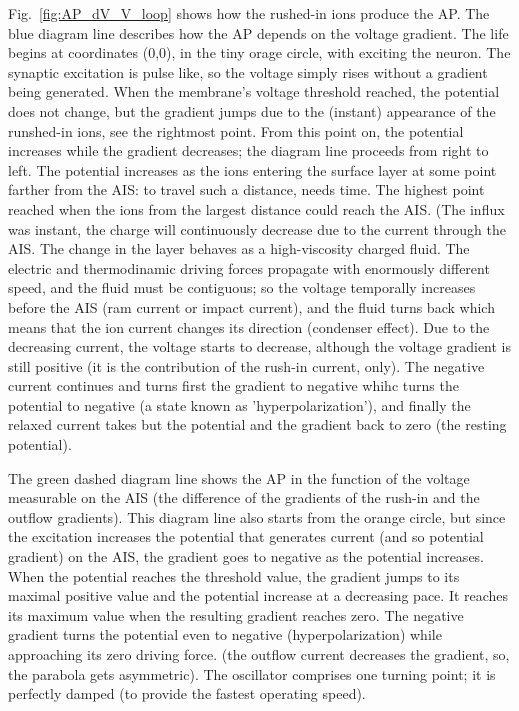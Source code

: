 Fig.~\ref{fig:AP_dV_V_loop} shows how the rushed-in ions produce the 
\gls{AP}. The blue diagram line describes how the AP depends on the voltage gradient.
The life begins at coordinates (0,0), in the tiny orage circle, with
exciting the neuron. 
The synaptic excitation is pulse like, so the
voltage simply rises without a gradient being generated.
When the membrane's voltage threshold reached, the potential does not change,
but the gradient jumps due to the (instant) appearance of the runshed-in ions,
see the rightmost point. 
From this point on, the potential increases while the gradient decreases;
the diagram line proceeds from right to left.
The potential increases as the ions entering the surface layer at some
point farther from the \gls{AIS}: to travel such a distance, needs time.
The highest point reached when the ions from the largest distance could
reach the AIS. (The influx was instant, the charge will continuously decrease
due to the current through the AIS.
The change in the layer behaves as a high-viscosity charged fluid.
The electric and thermodinamic driving forces propagate with enormously
different speed, and the fluid must be contiguous; so the voltage temporally increases before the AIS
(ram current or impact current), and the fluid turns back which means that the ion current changes its direction (condenser effect).
Due to the decreasing current, the voltage starts to decrease, although 
the voltage gradient is still positive (it is the contribution of the
rush-in current, only). The negative current continues and turns first
the gradient to negative whihc turns the potential to negative
(a state known as 'hyperpolarization'), and finally the relaxed current
takes but the potential and the gradient back to zero (the resting potential).

The green dashed diagram line shows the AP in the function of the voltage
measurable on the AIS (the difference of the gradients of the rush-in
and the outflow gradients). 
This diagram line also starts from the orange circle, but since the excitation
increases the potential that generates current (and so potential gradient) 
on the AIS, the gradient goes to negative as the potential increases.
When the potential reaches the threshold value, the gradient jumps to
its maximal positive value and the potential increase at a decreasing pace.
It reaches its maximum value when the resulting gradient reaches zero. 
The negative gradient turns the potential even to negative (hyperpolarization)
while approaching its zero driving force. 
(the outflow current decreases the gradient, so, the parabola gets asymmetric). 
The oscillator comprises one turning point; it is perfectly damped (to provide the fastest operating speed).

